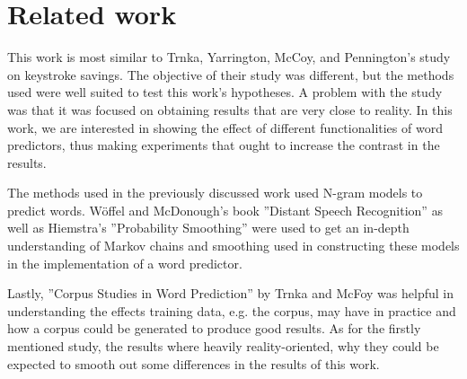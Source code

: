 \section{Related work}

This work is most similar to Trnka, Yarrington, McCoy, and Pennington's study \cite{keystrokes} on keystroke savings. The objective of their study was different, but the methods used were well suited to test this work's hypotheses. A problem with the study was that it was focused on obtaining results that are very close to reality. In this work, we are interested in showing the effect of different functionalities of word predictors, thus making experiments that ought to increase the contrast in the results.

The methods used in the previously discussed work used N-gram models to predict words. Wöffel and McDonough's book ''Distant Speech Recognition'' \cite{search} as well as Hiemstra's ''Probability Smoothing'' \cite{smoothing} were used to get an in-depth understanding of Markov chains and smoothing used in constructing these models in the implementation of a word predictor.

Lastly, ''Corpus Studies in Word Prediction'' by Trnka and McFoy \cite{corpus} was helpful in understanding the effects training data, e.g. the corpus, may have in practice and how a corpus could be generated to produce good results. As for the firstly mentioned study, the results where heavily reality-oriented, why they could be expected to smooth out some differences in the results of this work.